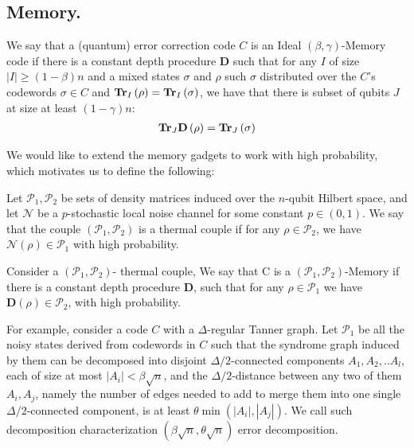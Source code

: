\documentclass[manuscript,screen,review]{acmart}
\begin{document}
{ \subsection{Memory.} 
 \newcommand*{\DD}{\mathbf{D} }
 \begin{definition}
   We say that a (quantum) error correction code $C$ is an Ideal $(\beta,\gamma)$-Memory code if there is a constant depth procedure $\DD$ such that for any $I$ of size $|I| \ge (1 - \beta) n$ and a mixed states $\sigma$ and $\rho$ such $\sigma$ distributed over the $C$'s codewords $\sigma \in C$ and $\mathbf{Tr}_{I}\left(\rho\right) = \mathbf{Tr}_{I}\left(\sigma\right)$, we have that there is subset of qubits $J$ at size at least $(1-\gamma)n$:
   \begin{equation*}
     \begin{split}
        \Tr_{J} \DD \left(\rho\right) = \Tr_{J}\left(\sigma\right) 
     \end{split}
   \end{equation*}

 \end{definition}
We would like to extend the memory gadgets to work with high probability, which motivates us to define the following:
\newcommand*{\Po}{\mathcal{P}_{1}}
\newcommand*{\Pt}{\mathcal{P}_{2}}
\newcommand*{\Nn}{\mathcal{N}}
\begin{definition}[ $\left(\Po,\Pt \right)$- thermal couple. ]
Let $\Po,\Pt$ be sets of density matrices induced over the $n$-qubit Hilbert space, and let $\Nn$ be a $p$-stochastic local noise channel for some constant $p \in (0,1)$. We say that the couple $\left(\Po,\Pt \right)$ is a thermal couple if for any $\rho \in \Pt$, we have $\Nn(\rho) \in \Po$ with high probability.
\end{definition}

 \begin{definition}[$(\Po,\Pt)$-Memory]
   Consider a $\left(\Po,\Pt \right)$- thermal couple, We say that C is a $(\Po, \Pt)$-Memory if there is a constant depth procedure $\DD$, such that for any $\rho \in \Po$ we have $\DD\left( \rho \right) \in \Pt$, with high probability. 
 \end{definition}
 For example, consider a code $C$ with a $\Delta$-regular Tanner graph. Let $\Po$ be all the noisy states derived from codewords in $C$ such that the syndrome graph induced by them can be decomposed into disjoint $\Delta/2$-connected components $A_{1},A_{2},..A_{l}$, each of size at most $|A_{i}| < \beta \sqrt{n}$, and the $\Delta/2$-distance between any two of them $A_{i}, A_{j}$, namely the number of edges needed to add to merge them into one single $\Delta/2$-connected component, is at least $\theta \min \left( |A_{i}|, |A_{j}| \right)$. We call such decomposition characterization $(\beta \sqrt{n}, \theta \sqrt{n})$ error decomposition. 

}
\end{document}
